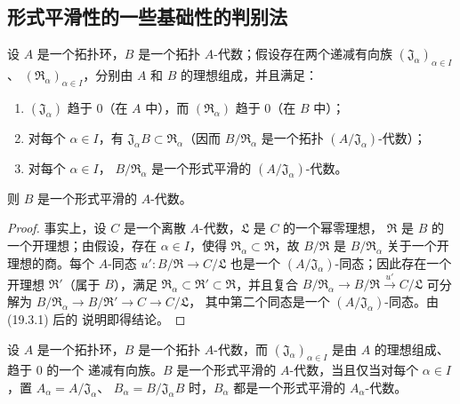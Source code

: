 \subsection{形式平滑性的一些基础性的判别法}
\label{subsection:0.19.4-fr}

\begin{proposition}[19.4.1]
\label{0.19.4.1-fr}
设 $A$ 是一个拓扑环，$B$ 是一个拓扑 $A$-代数；假设存在两个递减有向族
$(\mathfrak J_\alpha)_{\alpha\in I}$、
$(\mathfrak R_\alpha)_{\alpha\in I}$，分别由 $A$ 和 $B$ 的理想组成，并且满足：
\begin{enumerate}
  \item[$1^\circ$] $(\mathfrak J_\alpha)$ 趋于 $0$（在 $A$ 中），而
  $(\mathfrak R_\alpha)$ 趋于 $0$（在 $B$ 中）；
  \item[$2^\circ$] 对每个 $\alpha\in I$，有
  $\mathfrak J_\alpha B\subset\mathfrak R_\alpha$（因而
  $B/\mathfrak R_\alpha$ 是一个拓扑
  $(A/\mathfrak J_\alpha)$-代数）；
  \item[$3^\circ$] 对每个 $\alpha\in I$，
  $B/\mathfrak R_\alpha$ 是一个形式平滑的
  $(A/\mathfrak J_\alpha)$-代数。
\end{enumerate}
则 $B$ 是一个形式平滑的 $A$-代数。
\end{proposition}

\begin{proof}
事实上，设 $C$ 是一个离散 $A$-代数，$\mathfrak L$ 是 $C$ 的一个幂零理想，
$\mathfrak R$ 是 $B$ 的一个开理想；由假设，存在 $\alpha\in I$，使得
$\mathfrak R_\alpha\subset\mathfrak R$，故 $B/\mathfrak R$ 是
$B/\mathfrak R_\alpha$ 关于一个开理想的商。每个 $A$-同态
$u':B/\mathfrak R\to C/\mathfrak L$ 也是一个
$(A/\mathfrak J_\alpha)$-同态；因此存在一个开理想
$\mathfrak R'$（属于 $B$），满足
$\mathfrak R_\alpha\subset\mathfrak R'\subset\mathfrak R$，并且复合
$B/\mathfrak R_\alpha\to B/\mathfrak R\xrightarrow{u'}C/\mathfrak L$
可分解为
$B/\mathfrak R_\alpha\to B/\mathfrak R'\to C\to C/\mathfrak L$，
其中第二个同态是一个 $(A/\mathfrak J_\alpha)$-同态。由 (19.3.1) 后的
说明即得结论。
\end{proof}

\begin{corollary}[19.4.2]
\label{0.19.4.2-fr}
设 $A$ 是一个拓扑环，$B$ 是一个拓扑 $A$-代数，而
$(\mathfrak J_\alpha)_{\alpha\in I}$ 是由 $A$ 的理想组成、趋于 $0$ 的一个
递减有向族。$B$ 是一个形式平滑的 $A$-代数，当且仅当对每个
$\alpha\in I$，置 $A_\alpha=A/\mathfrak J_\alpha$、
$B_\alpha=B/\mathfrak J_\alpha B$ 时，$B_\alpha$ 都是一个形式平滑的
$A_\alpha$-代数。
\end{corollary}

